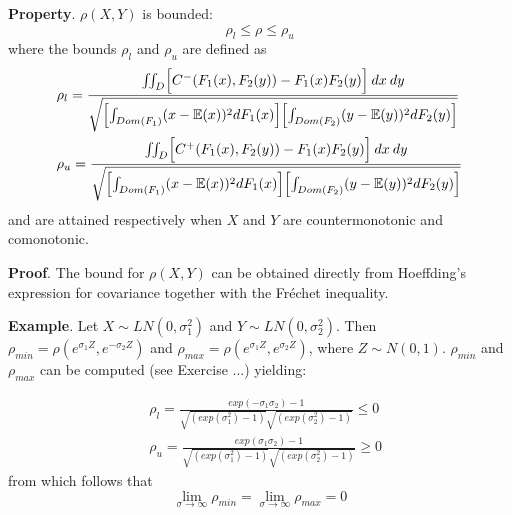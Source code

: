 \documentclass{article}
\begin{document}
\bigskip
\noindent\textbf{Property}. $\rho(X,Y)$ is bounded:
$$
\rho_l \le \rho \le \rho_u
$$
where the bounds $\rho_l$ and $\rho_u$ are defined as
\begin{equation}
\begin{split}
& \rho_l = \frac{\iint_D \Bigl[ C^-(F_1(x), F_2(y)) - F_1(x)F_2(y) \Bigr] \> dx\>dy}
                        {\sqrt{
                                  \Bigl[ \int_{Dom(F_1)}(x-\mathbb{E}(x))^2dF_1(x) \Bigr]
                                  \Bigl[ \int_{Dom(F_2)}(y-\mathbb{E}(y))^2dF_2(y) \Bigr]
                                 }
                        } \\
& \rho_u = \frac{\iint_D \Bigl[ C^+(F_1(x), F_2(y)) - F_1(x)F_2(y) \Bigr] \> dx\>dy}
                        {\sqrt{
                                  \Bigl[ \int_{Dom(F_1)}(x-\mathbb{E}(x))^2dF_1(x) \Bigr]
                                  \Bigl[ \int_{Dom(F_2)}(y-\mathbb{E}(y))^2dF_2(y) \Bigr]
                                 }
                        } \\
\end{split}
\end{equation}
and are attained respectively when $X$ and $Y$ are countermonotonic and comonotonic.

\noindent\textbf{Proof}. The bound for $\rho(X,Y)$ can be obtained directly from Hoeffding's expression for covariance together with the Fréchet inequality. 
	
\bigskip	
\noindent\textbf{Example}. Let $X \sim LN(0, \sigma_1^2)$ and $Y \sim LN(0, \sigma_2^2)$. Then $\rho_{min} = \rho(e^{\sigma_1Z}, e^{-\sigma_2 Z})$ and $\rho_{max} = \rho(e^{\sigma_1Z}, e^{\sigma_2 Z})$, where $Z \sim N(0,1)$. $\rho_{min}$ and $\rho_{max}$ can be computed (see Exercise ...) yielding:

\begin{equation}
\begin{split}
& \rho_l = \frac{exp(-\sigma_1 \sigma_2) - 1}
                        {
                         \sqrt{(exp(\sigma_1^2) - 1)}
                         \sqrt{(exp(\sigma_2^2) - 1)}
                        } \le 0 \\
& \rho_u = \frac{exp(\sigma_1 \sigma_2) - 1}
                        {
                         \sqrt{(exp(\sigma_1^2) - 1)}
                         \sqrt{(exp(\sigma_2^2) - 1)}
                        } \ge 0
\end{split}
\end{equation}
from which follows that
$$
\lim\limits_{\sigma \rightarrow \infty} \rho_{min} =\lim\limits_{\sigma \rightarrow \infty} \rho_{max}=0  
$$
\end{document}
